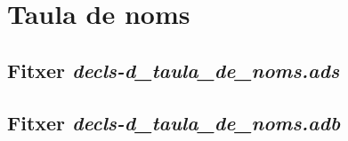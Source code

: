 \section{Taula de noms}

\subsection{Fitxer \emph{decls-d\_taula\_de\_noms.ads}}

\newpage

\subsection{Fitxer \emph{decls-d\_taula\_de\_noms.adb}}

\newpage
